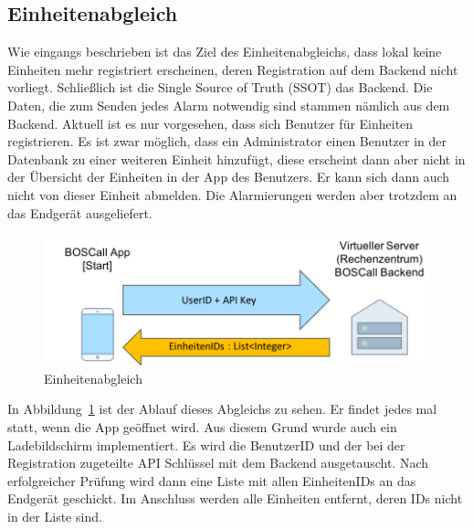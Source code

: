 \subsection{Einheitenabgleich}
Wie eingangs beschrieben ist das Ziel des Einheitenabgleichs, dass lokal keine Einheiten mehr registriert erscheinen, deren Registration auf dem Backend nicht vorliegt. Schließlich ist die Single Source of Truth (SSOT) das Backend. Die Daten, die zum Senden jedes Alarm notwendig sind stammen nämlich aus dem Backend. Aktuell ist es nur vorgesehen, dass sich Benutzer für Einheiten registrieren. Es ist zwar möglich, dass ein Administrator einen Benutzer in der Datenbank zu einer weiteren Einheit hinzufügt, diese erscheint dann aber nicht in der Übersicht der Einheiten in der App des Benutzers. Er kann sich dann auch nicht von dieser Einheit abmelden. Die Alarmierungen werden aber trotzdem an das Endgerät ausgeliefert.

\begin{figure}[H]
	\centering
	\includegraphics[width=\linewidth]{include/img/einheitenabgleich}
	\caption{Einheitenabgleich}
	\label{fig:einheitenabgleich}
\end{figure}

In Abbildung~\ref{fig:einheitenabgleich} ist der Ablauf dieses Abgleichs zu sehen. Er findet jedes mal statt, wenn die App geöffnet wird. Aus diesem Grund wurde auch ein Ladebildschirm implementiert. Es wird die BenutzerID und der bei der Registration zugeteilte API Schlüssel mit dem Backend ausgetauscht. Nach erfolgreicher Prüfung wird dann eine Liste mit allen EinheitenIDs an das Endgerät geschickt. Im Anschluss werden alle Einheiten entfernt, deren IDs nicht in der Liste sind.

